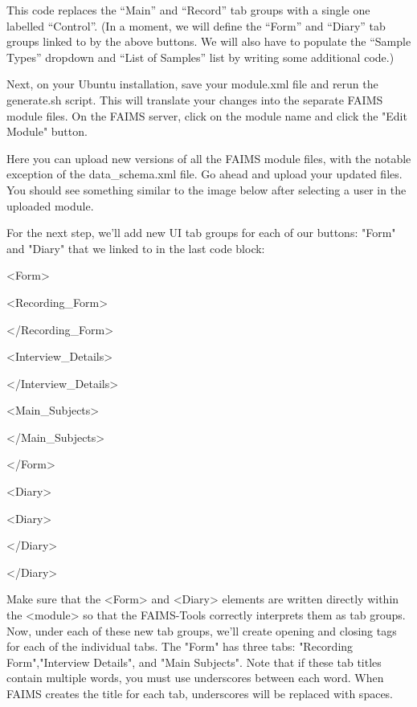 This code replaces the “Main” and “Record” tab groups with a single one labelled “Control”. (In a moment, we will define the “Form” and “Diary” tab groups linked to by the above buttons. We will also have to populate the “Sample Types” dropdown and “List of Samples” list by writing some additional code.)

Next, on your Ubuntu installation, save your module.xml file and rerun the generate.sh script. This will translate your changes into the separate FAIMS module files. On the FAIMS server, click on the module name and click the "Edit Module" button.

{}

Here you can upload new versions of all the FAIMS module files, with the notable exception of the data_schema.xml file. Go ahead and upload your updated files. You should see something similar to the image below after selecting a user in the uploaded module.

{}

For the next step, we'll add new UI tab groups for each of our buttons: "Form" and "Diary" that we linked to in the last code block:

<Form>

<Recording_Form>

</Recording_Form>

<Interview_Details>

</Interview_Details>

<Main_Subjects>

</Main_Subjects>

</Form>

<Diary>

<Diary>

</Diary>

</Diary>

Make sure that the <Form> and <Diary> elements are written directly within the <module> so that the FAIMS-Tools correctly interprets them as tab groups. Now, under each of these new tab groups, we'll create opening and closing tags for each of the individual tabs. The "Form" has three tabs: "Recording Form","Interview Details", and "Main Subjects". Note that if these tab titles contain multiple words, you must use underscores between each word. When FAIMS creates the title for each tab, underscores will be replaced with spaces.

{}

